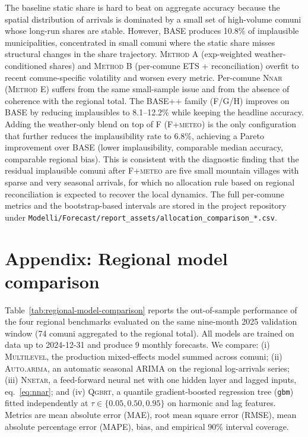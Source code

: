 \documentclass[11pt,a4paper]{article}
\begin{document}
The baseline static share is hard to beat on aggregate accuracy because the spatial distribution of arrivals is dominated by a small set of high-volume comuni whose long-run shares are stable. However, BASE produces 10.8\% of implausible municipalities, concentrated in small comuni where the static share misses structural changes in the share trajectory. \textsc{Method A} (exp-weighted weather-conditioned shares) and \textsc{Method B} (per-comune ETS + reconciliation) overfit to recent comune-specific volatility and worsen every metric. Per-comune \textsc{Nnar} (\textsc{Method E}) suffers from the same small-sample issue and from the absence of coherence with the regional total. The BASE++ family (\textsc{F/G/H}) improves on BASE by reducing implausibles to 8.1--12.2\% while keeping the headline accuracy. Adding the weather-only blend on top of \textsc{F} (\textsc{F+meteo}) is the only configuration that further reduces the implausibility rate to 6.8\%, achieving a Pareto improvement over BASE (lower implausibility, comparable median accuracy, comparable regional bias). This is consistent with the diagnostic finding that the residual implausible comuni after \textsc{F+meteo} are five small mountain villages with sparse and very seasonal arrivals, for which no allocation rule based on regional reconciliation is expected to recover the local dynamics. The full per-comune metrics and the bootstrap-based intervals are stored in the project repository under \texttt{Modelli/Forecast/report\_assets/allocation\_comparison\_*.csv}.

\section{Appendix: Regional model comparison}
\label{app:regional-model-comparison}

Table~\ref{tab:regional-model-comparison} reports the out-of-sample performance of the four regional benchmarks evaluated on the same nine-month 2025 validation window (74 comuni aggregated to the regional total). All models are trained on data up to 2024-12-31 and produce 9 monthly forecasts. We compare: (i) \textsc{Multilevel}, the production mixed-effects model summed across comuni; (ii) \textsc{Auto.arima}, an automatic seasonal ARIMA on the regional log-arrivals series; (iii) \textsc{Nnetar}, a feed-forward neural net with one hidden layer and lagged inputs, eq.~\eqref{eq:nnar}; and (iv) \textsc{Qgbrt}, a quantile gradient-boosted regression tree (\texttt{gbm}) fitted independently at $\tau\in\{0.05, 0.50, 0.95\}$ on harmonic and lag features. Metrics are mean absolute error (MAE), root mean square error (RMSE), mean absolute percentage error (MAPE), bias, and empirical 90\% interval coverage.
\end{document}
